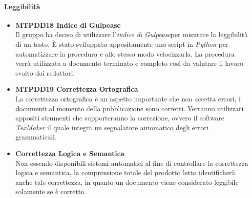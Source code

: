 \paragraph{Leggibilità}
\begin{itemize}
	\item \textbf{MTPDD18 Indice di Gulpease}\-\\
Il gruppo ha deciso di utilizzare l'\textit{indice di Gulpease}\glossario per misurare la leggibilità di un testo. È stato sviluppato appositamente uno script in \textit{Python} per automatizzare la procedura e allo stesso modo velocizzarla. La procedura verrà utilizzata a documento terminato e completo così da valutare il lavoro svolto dai redattori.

	\item \textbf{MTPDD19 Correttezza Ortografica}\-\\
La correttezza ortografica è un aspetto importante che non accetta errori, i documenti al momento della pubblicazione sono corretti. Verranno utilizzati appositi strumenti che supporteranno la correzione, ovvero il software \textit{TexMaker} il quale integra un segnalatore automatico degli errori grammaticali. 

	\item \textbf{Correttezza Logica e Semantica} \-\\
Non essendo disponibili sistemi automatici al fine di controllare la correttezza logica e semantica, la comprensione totale del prodotto letto identificherà anche tale correttezza, in quanto un documento viene considerato leggibile solamente se è corretto.
\end{itemize}


